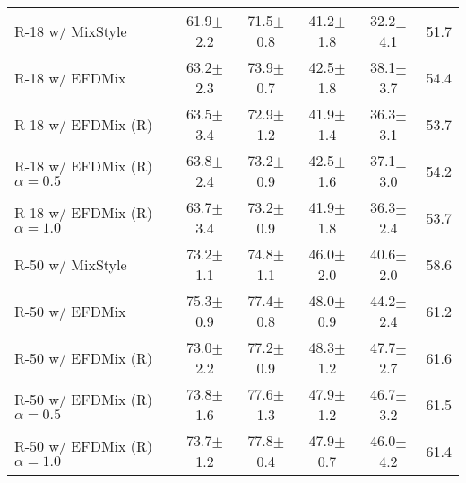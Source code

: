 \begin{table}[!t]
{\begin{tabular}{lccccc}
\multicolumn{1}{l|}{R-18 w/ MixStyle \cite{zhou2020domain}}               & 61.9$\pm$2.2 & 71.5$\pm$0.8     & 41.2$\pm$1.8   & 32.2$\pm$4.1    & 51.7             \\
\multicolumn{1}{l|}{R-18 w/ EFDMix \cite{zhang2021exact}}                 & 63.2$\pm$2.3 & 73.9$\pm$0.7     & 42.5$\pm$1.8   & 38.1$\pm$3.7    & 54.4             \\
\multicolumn{1}{l|}{R-18 w/ EFDMix (R)}             & 63.5$\pm$3.4 & 72.9$\pm$1.2     & 41.9$\pm$1.4   & 36.3$\pm$3.1    & 53.7             \\ 
\multicolumn{1}{l|}{R-18 w/ EFDMix (R) $\alpha=0.5$} & 63.8$\pm$2.4 & 73.2$\pm$0.9     & 42.5$\pm$1.6   & 37.1$\pm$3.0    & 54.2 \\
\multicolumn{1}{l|}{R-18 w/ EFDMix (R) $\alpha=1.0$} & 63.7$\pm$3.4 & 73.2$\pm$0.9     & 41.9$\pm$1.8   & 36.3$\pm$2.4    & 53.7 \\ \hline
\multicolumn{1}{l|}{R-50 w/ MixStyle \cite{zhou2020domain}}               & 73.2$\pm$1.1 & 74.8$\pm$1.1     & 46.0$\pm$2.0   & 40.6$\pm$2.0    & 58.6             \\
\multicolumn{1}{l|}{R-50 w/ EFDMix \cite{zhang2021exact}}                 & 75.3$\pm$0.9 & 77.4$\pm$0.8     & 48.0$\pm$0.9   & 44.2$\pm$2.4    & 61.2             \\
\multicolumn{1}{l|}{R-50 w/ EFDMix (R)}             & 73.0$\pm$2.2 & 77.2$\pm$0.9     & 48.3$\pm$1.2   & 47.7$\pm$2.7    & 61.6             \\
\multicolumn{1}{l|}{R-50 w/ EFDMix (R) $\alpha=0.5$} & 73.8$\pm$1.6 & 77.6$\pm$1.3     & 47.9$\pm$1.2   & 46.7$\pm$3.2    & 61.5    \\
\multicolumn{1}{l|}{R-50 w/ EFDMix (R) $\alpha=1.0$} & 73.7$\pm$1.2 & 77.8$\pm$0.4     & 47.9$\pm$0.7   & 46.0$\pm$4.2    & 61.4     
\end{tabular}}
\end{table}


